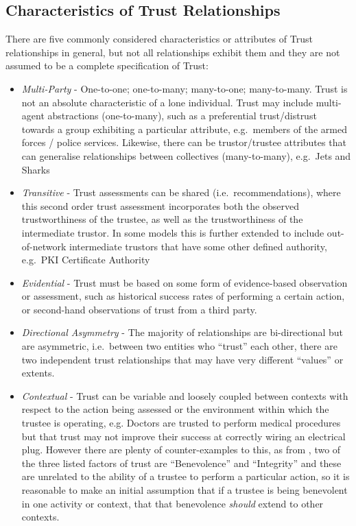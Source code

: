 

\subsection{Characteristics of Trust Relationships}

There are five commonly considered characteristics or attributes of Trust relationships in general, but not all relationships exhibit them and they are not assumed to be a complete specification of Trust:

\begin{itemize}
  \item \emph{Multi-Party} - One-to-one; one-to-many; many-to-one; many-to-many.
    Trust is not an absolute characteristic of a lone individual.
    Trust may include multi-agent abstractions (one-to-many), such as a preferential trust/distrust towards a group exhibiting a particular attribute, e.g.\ members of the armed forces / police services.
    Likewise, there can be trustor/trustee attributes that can generalise relationships between collectives (many-to-many), e.g.\ Jets and Sharks
  \item \emph{Transitive} - Trust assessments can be shared (i.e.\ recommendations), where this second order trust assessment incorporates both the observed trustworthiness of the trustee, as well as the trustworthiness of the intermediate trustor.
    In some models this is further extended to include out-of-network intermediate trustors that have some other defined authority, e.g.\ PKI Certificate Authority
  \item \emph{Evidential} - Trust must be based on some form of evidence-based observation or assessment, such as historical success rates of performing a certain action, or second-hand observations of trust from a third party.
  \item \emph{Directional Asymmetry} - The majority of relationships are bi-directional but are asymmetric, i.e.\ between two entities who ``trust'' each other, there are two independent trust relationships that may have very different ``values'' or extents.
  \item \emph{Contextual} - Trust can be variable and loosely coupled between contexts with respect to the action being assessed or the environment within which the trustee is operating, e.g.
    Doctors are trusted to perform medical procedures but that trust may not improve their success at correctly wiring an electrical plug.
    However there are plenty of counter-examples to this, as from \cite{Mayer1995}, two of the three listed factors of trust are ``Benevolence'' and ``Integrity'' and these are unrelated to the ability of a trustee to perform a particular action, so it is reasonable to make an initial assumption that if a trustee is being benevolent in one activity or context, that that benevolence \emph{should} extend to other contexts.

\end{itemize}
